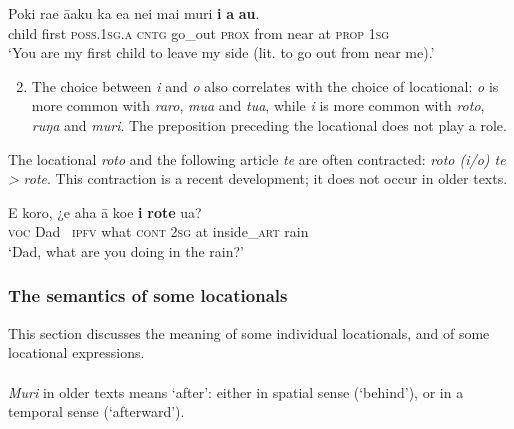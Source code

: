\ea\label{ex:3.140}
\gll Poki ra{\ꞌ}e {\ꞌ}ā{\ꞌ}aku ka e{\ꞌ}a nei mai muri \textbf{i} \textbf{a} \textbf{au}.\\
child first \textsc{poss.1sg.a} \textsc{cntg} go\_out \textsc{prox} from near at \textsc{prop} \textsc{1sg}\\

\glt
‘You are my first child to leave my side (lit. to go out from near me).’ \textstyleExampleref{[R210.049]} 
\z

\begin{enumerate}
\setcounter{enumi}{1}
\item 
The choice between \textit{i} and \textit{o} also correlates with the choice of locational: \textit{o} is more common with \textit{raro}, \textit{mu{\ꞌ}a} and \textit{tu{\ꞌ}a}, while \textit{i} is more common with \textit{roto}, \textit{ruŋa} and \textit{muri}. The preposition preceding the locational does not play a role.

\end{enumerate}

The locational \textit{roto} and the following article \textit{te} are often contracted: \textit{roto (i/o) te {\textgreater}} \textit{rote}. This contraction is a recent development; it does not occur in older texts. 

\ea\label{ex:3.141}
\gll E koro, ¿e aha {\ꞌ}ā koe \textbf{{\ꞌ}i} \textbf{rote} {\ꞌ}ua? \\
\textsc{voc} Dad ~\textsc{ipfv} what \textsc{cont} \textsc{2sg} at inside\_\textsc{art} rain \\

\glt 
‘Dad, what are you doing in the rain?’ \textstyleExampleref{[R210.097]} 
\z

\subsubsection[The semantics of some locationals]{The semantics of some locationals}\label{sec:3.6.2.3}
This section discusses the meaning of some individual locationals, and of some locational expressions.

\paragraph{}\label{sec:3.6.2.3.1} \textit{Muri} in older texts means ‘after’: either in spatial sense (‘behind’), or in a temporal sense (‘afterward’). 

